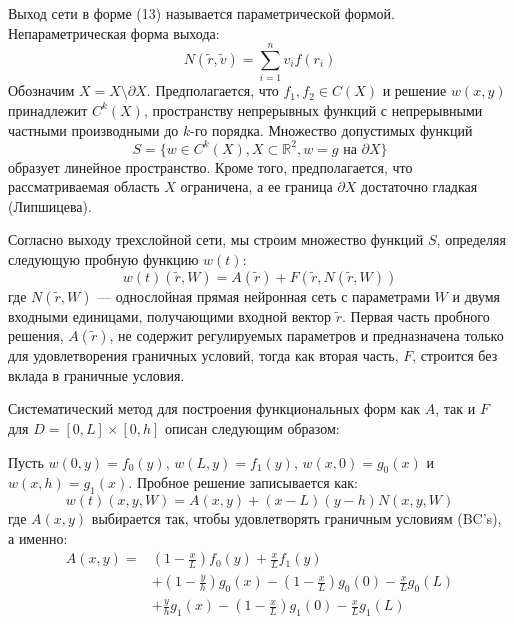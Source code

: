 \documentclass[a4paper,12pt]{article}
\theoremstyle{plain} %
\theoremstyle{definition} %
\theoremstyle{remark} %
\begin{document}
Выход сети в форме (13) называется параметрической формой. Непараметрическая форма выхода:
\begin{equation}
N(\tilde{r}, \tilde{v}) = \sum_{i=1}^{n} v_i f(r_i)
\end{equation}
Обозначим $X = X \setminus \partial X$. Предполагается, что $f_1, f_2 \in C(X)$ и решение $w(x, y)$ принадлежит $C^k(X)$, пространству непрерывных функций с непрерывными частными производными до $k$-го порядка. Множество допустимых функций
\begin{equation}
S = \{ w \in C^k(X), X \subset \mathbb{R}^2, w = g \text{ на } \partial X \}
\end{equation}
образует линейное пространство. Кроме того, предполагается, что рассматриваемая область $X$ ограничена, а ее граница $\partial X$ достаточно гладкая (Липшицева).

Согласно выходу трехслойной сети, мы строим множество функций $S$, определяя следующую пробную функцию $w(t)$:
\begin{equation}
w(t)(\tilde{r}, W) = A(\tilde{r}) + F(\tilde{r}, N(\tilde{r}, W))
\end{equation}
где $N(\tilde{r}, W)$ — однослойная прямая нейронная сеть с параметрами $W$ и двумя входными единицами, получающими входной вектор $\tilde{r}$. Первая часть пробного решения, $A(\tilde{r})$, не содержит регулируемых параметров и предназначена только для удовлетворения граничных условий, тогда как вторая часть, $F$, строится без вклада в граничные условия.

Систематический метод для построения функциональных форм как $A$, так и $F$ для $D = [0, L] \times [0, h]$ описан следующим образом:

Пусть $w(0, y) = f_0(y)$, $w(L, y) = f_1(y)$, $w(x, 0) = g_0(x)$ и $w(x, h) = g_1(x)$. Пробное решение записывается как:
\[
w(t)(x, y, W) = A(x, y) + (x - L)(y - h) N(x, y, W)
\]
где $A(x, y)$ выбирается так, чтобы удовлетворять граничным условиям (BC’s), а именно:
\begin{equation}
\begin{split}
A(x, y) = & \left(1 - \frac{x}{L}\right) f_0(y) + \frac{x}{L} f_1(y) \\
& + \left(1 - \frac{y}{h}\right) g_0(x) - \left(1 - \frac{x}{L}\right) g_0(0) - \frac{x}{L} g_0(L) \\
& + \frac{y}{h} g_1(x) - \left(1 - \frac{x}{L}\right) g_1(0) - \frac{x}{L} g_1(L)
\end{split}
\end{equation}
\end{document}
